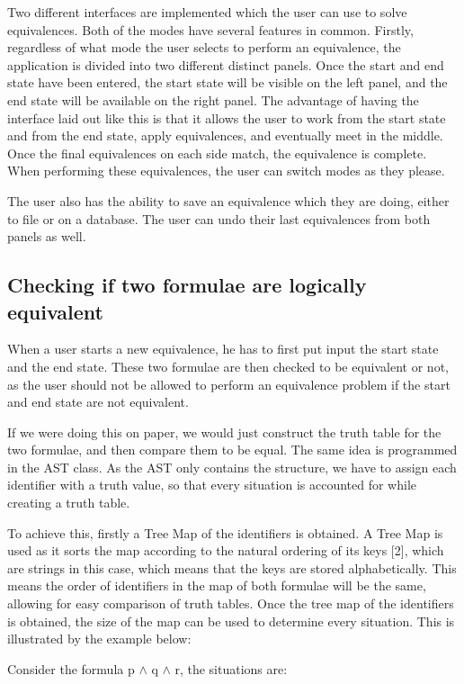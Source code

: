 \documentclass{report}
\begin{document}
Two different interfaces are implemented which the user can use to solve equivalences.
Both of the modes have several features in common. Firstly, regardless of what mode
the user selects to perform an equivalence, the application is divided into two
different distinct panels. Once the start and end state have been entered, the
start state will be visible on the left panel, and the end state will be available on
the right panel. The advantage of having the interface laid out like this is that
it allows the user to work from the start state and from the end state, apply
equivalences, and eventually meet in the middle. Once the final equivalences on each
side match, the equivalence is complete. When performing these equivalences, the
user can switch modes as they please.

The user also has the ability to save an equivalence which they are doing, either
to file or on a database. The user can undo their last equivalences from both panels
as well.


\subsection{Checking if two formulae are logically equivalent}

When a user starts a new equivalence, he has to first put input the start
state and the end state. These two formulae are then checked to be equivalent
or not, as the user should not be allowed to perform an equivalence problem
if the start and end state are not equivalent.

If we were doing this on paper, we would just construct the truth table for
the two formulae, and then compare them to be equal. The same idea is programmed
in the AST class. As the AST only contains the structure, we have to assign each
identifier with a truth value, so that every situation is accounted for while
creating a truth table.

To achieve this, firstly a Tree Map of the identifiers is obtained. A Tree Map is
used as it sorts the map according to the natural ordering of its keys [2], which are
strings in this case, which means that the keys are stored alphabetically. This means
the order of identifiers in the map of both formulae will be the same, allowing for
easy comparison of truth tables. Once the tree map of the identifiers is obtained,
the size of the map can be used to determine every situation. This is illustrated
by the example below:

Consider the formula p $\land$ q $\land$ r, the situations are:
\end{document}
